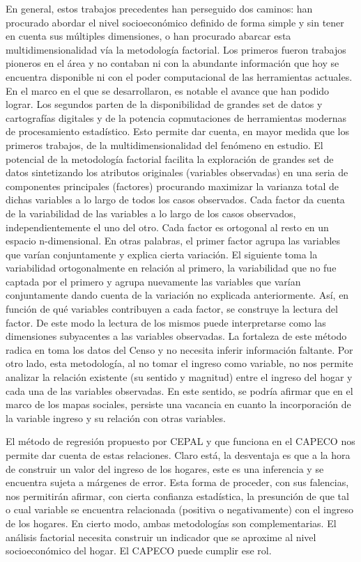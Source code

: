 En general, estos trabajos precedentes han perseguido dos caminos: han procurado abordar el nivel socioeconómico definido de forma simple y sin tener en cuenta sus múltiples dimensiones, o han procurado abarcar esta multidimensionalidad vía la metodología factorial. Los primeros fueron trabajos pioneros en el área y no contaban ni con la abundante información que hoy se encuentra disponible ni con el poder computacional de las herramientas actuales. En el marco en el que se desarrollaron, es notable el avance que han podido lograr. Los segundos parten de la disponibilidad de grandes set de datos y cartografías digitales y de la potencia copmutaciones de herramientas modernas de procesamiento estadístico. Esto permite dar cuenta, en mayor medida que los primeros trabajos, de la multidimensionalidad del fenómeno en estudio. El potencial de la metodología factorial facilita la exploración de grandes set de datos sintetizando los atributos originales (variables observadas) en una seria de componentes principales (factores) procurando maximizar la varianza total de dichas variables a lo largo de todos los casos observados. Cada factor da cuenta de la variabilidad de las variables a lo largo de los casos observados, independientemente el uno del otro. Cada factor es ortogonal al resto en un espacio n-dimensional.  En otras palabras, el primer factor agrupa las variables que varían conjuntamente y explica cierta variación. El siguiente toma la variabilidad ortogonalmente en relación al primero, la variabilidad que no fue captada por el primero y agrupa nuevamente las variables que varían conjuntamente dando cuenta de la variación no explicada anteriormente. Así, en función de qué variables contribuyen a cada factor, se construye la lectura del factor. De este modo la lectura de los mismos puede interpretarse  como las dimensiones subyacentes a las variables observadas. La fortaleza de este método radica en toma los datos del Censo y no necesita inferir información faltante. Por otro lado, esta metodología, al no tomar el ingreso como variable, no nos permite analizar la relación existente (su sentido y magnitud) entre el ingreso del hogar y cada una de las variables observadas. En este sentido, se podría afirmar que en el marco de los mapas sociales, persiste una vacancia en cuanto la incorporación de la variable ingreso y su relación con otras variables.

El método de regresión propuesto por CEPAL y que funciona en el CAPECO nos permite dar cuenta de estas relaciones. Claro está, la desventaja es que a la hora de construir un valor del ingreso de los hogares, este es una inferencia y se encuentra sujeta a márgenes de error. Esta forma de proceder, con sus falencias, nos permitirán afirmar, con cierta confianza estadística, la presunción de que tal o cual variable se encuentra relacionada (positiva o negativamente) con el ingreso de los hogares. En cierto modo, ambas metodologías son complementarias. El análisis factorial necesita construir un indicador que se aproxime al nivel socioeconómico del hogar. El CAPECO puede cumplir ese rol.


